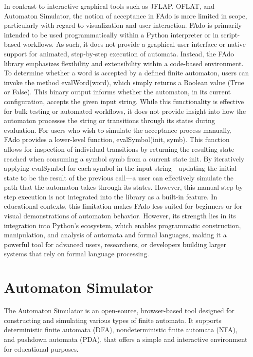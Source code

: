In contrast to interactive graphical tools such as JFLAP, OFLAT, and Automaton Simulator, the notion of acceptance in FAdo is more limited in scope, 
particularly with regard to visualization and user interaction. 
FAdo is primarily intended to be used programmatically within a Python interpreter or in script-based workflows. 
As such, it does not provide a graphical user interface or native support for animated, step-by-step execution of automata.
Instead, the FAdo library emphasizes flexibility and extensibility within a code-based environment. 
To determine whether a word is accepted by a defined finite automaton, users can invoke the method evalWord(word), 
which simply returns a Boolean value (True or False). 
This binary output informs whether the automaton, in its current configuration, accepts the given input string. 
While this functionality is effective for bulk testing or automated workflows, 
it does not provide insight into how the automaton processes the string or transitions through its states during evaluation.
For users who wish to simulate the acceptance process manually, FAdo provides a lower-level function, evalSymbol(init, symb). 
This function allows for inspection of individual transitions by returning the resulting state reached when consuming a symbol symb from a current state init. 
By iteratively applying evalSymbol for each symbol in the input string—updating 
the initial state to be the result of the previous call—a user can effectively simulate the path that the automaton takes through its states.
However, this manual step-by-step execution is not integrated into the library as a built-in feature.
In educational contexts, this limitation makes FAdo less suited for beginners or for visual demonstrations of automaton behavior. 
However, its strength lies in its integration into Python's ecosystem, which enables programmatic construction, manipulation, and analysis of automata and formal languages, 
making it a powerful tool for advanced users, researchers, or developers building larger systems that rely on formal language processing.

\section{Automaton Simulator}

The Automaton Simulator\cite{automatonSimulator} is an open-source, browser-based tool designed for constructing and simulating various types of finite automata. 
It supports deterministic finite automata (DFA), nondeterministic finite automata (NFA), and pushdown automata (PDA), 
that offers a simple and interactive environment for educational purposes.

